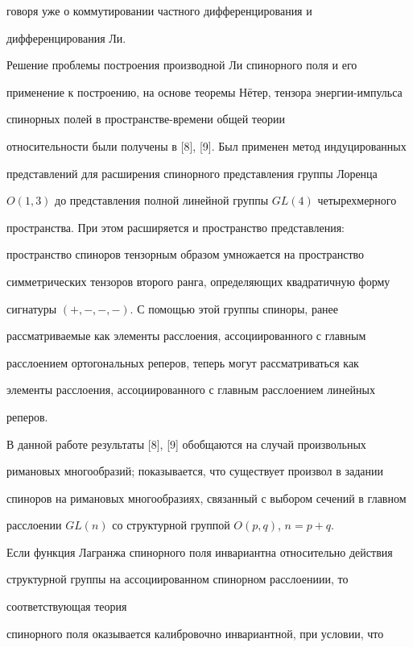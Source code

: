 говоря уже о коммутировании частного дифференцирования и


дифференцирования Ли.





Решение проблемы построения производной Ли спинорного поля и его


применение к построению, на основе теоремы Н\"етер, тензора энергии-импульса 


спинорных полей в пространстве-времени общей теории


относительности были получены в [8], [9]. Был применен метод индуцированных


представлений для расширения спинорного представления группы Лоренца


$O(1,3)$ до представления полной линейной группы $GL(4)$ четырехмерного


пространства. При этом расширяется и пространство представления:


пространство спиноров тензорным образом умножается на пространство


симметрических тензоров второго ранга, определяющих квадратичную форму


сигнатуры $(+,-,-,-)$. С помощью этой группы спиноры, ранее


рассматриваемые как элементы расслоения, ассоциированного с главным


расслоением ортогональных реперов, теперь могут рассматриваться как


элементы расслоения, ассоциированного с главным расслоением линейных


реперов.





В данной работе результаты [8], [9] обобщаются на случай произвольных


римановых многообразий; показывается, что существует произвол в задании


спиноров на римановых многообразиях, связанный с выбором сечений в главном


расслоении $GL(n)$ со структурной группой $O(p,q)$, $n=p+q$. 


Если функция Лагранжа спинорного поля инвариантна относительно действия


структурной группы на ассоциированном спинорном расслоениии, то


соответствующая теория


спинорного поля оказывается калибровочно инвариантной, при условии, что


